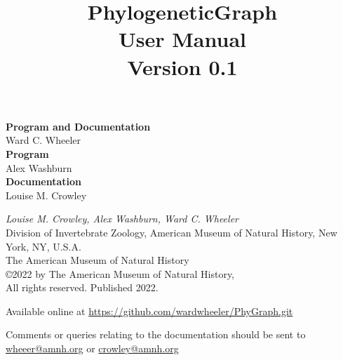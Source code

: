 \documentclass[11pt]{book}
\begin{document}
	
	\title{PhylogeneticGraph\\User Manual\\Version 0.1}
	
	\maketitle

	\newpage
	
	\begin{flushleft}
		\textbf {Program and Documentation} \\ Ward C. Wheeler \\
		\vspace*{0.50cm}
		\textbf {Program} \\ Alex Washburn  \\
		\vspace*{0.50cm}
		\textbf{Documentation} \\ Louise M. Crowley
	\end{flushleft}
	
	\vspace*{12.50cm}
	
	\begin{flushleft}
		\small
		{\it Louise M. Crowley, Alex Washburn,  Ward C. Wheeler} \\
		
		Division of Invertebrate Zoology, American Museum of Natural History, New York, NY, U.S.A.\\
		\smallskip
		The American Museum of Natural History\\
		\copyright  2022 by The American Museum of Natural History, \\
		All rights reserved. Published 2022.
		
		\vspace*{0.25cm}
		
		Available online at \url{https://github.com/wardwheeler/PhyGraph.git} 
		
		Comments or queries relating to the documentation should be sent to \href{mailto:wheeler@amnh.org}
		{wheeer@amnh.org} or \href{mailto:crowley@amnh.org}{crowley@amnh.org}
	\end{flushleft}
	
	\tableofcontents
\end{document}

